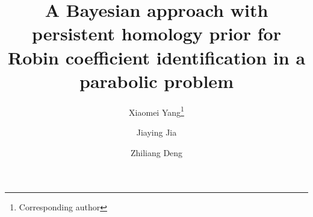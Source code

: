 \documentclass{ws-mplb}
\begin{document}

%
%

\title{A Bayesian approach with persistent homology prior for Robin coefficient identification in a parabolic problem 
}

\author{Xiaomei Yang\footnote{Corresponding author}}

\address{School of Mathematics, Southwest Jiaotong University, 
Chengdu, 611756, Sichuan, China
\\
yangxiaomath@swjtu.edu.cn}

\author{ Jiaying Jia}

\address{School of Mathematics, Southwest Jiaotong University, 
Chengdu, 611756, Sichuan, China\\
jiaying@my.swjtu.edu.cn}

\author{ Zhiliang Deng}

\address{School of Mathematical Sciences, University of Electronic Science andTechnology of China, Xiyuan Ave, Chengdu, 611731, Sichuan, China\\
dengzhl@uestc.edu.cn.}

\maketitle

\end{document}
